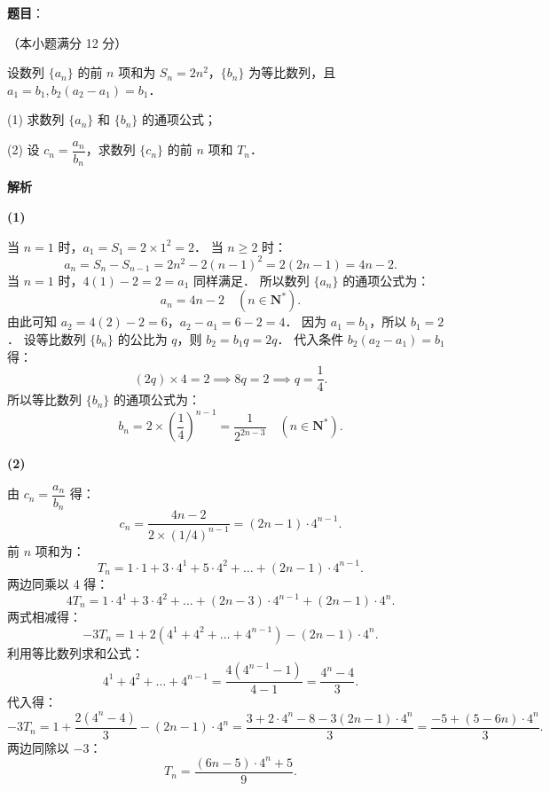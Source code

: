 \begin{answer}

\textbf{题目}：

（本小题满分 12 分）

设数列 $\{a_n\}$ 的前 $n$ 项和为 $S_n = 2n^2$，$\{b_n\}$ 为等比数列，且 $a_1 = b_1, b_2(a_2 - a_1) = b_1$．

(1) 求数列 $\{a_n\}$ 和 $\{b_n\}$ 的通项公式；

(2) 设 $c_n = \dfrac{a_n}{b_n}$，求数列 $\{c_n\}$ 的前 $n$ 项和 $T_n$．

\textbf{解析}

\textbf{(1)}

当 $n = 1$ 时，$a_1 = S_1 = 2 \times 1^2 = 2$．
当 $n \geqslant 2$ 时：
\nopagebreak[4]
\[
a_n = S_n - S_{n-1} = 2n^2 - 2(n - 1)^2 = 2(2n - 1) = 4n - 2.
\]
当 $n = 1$ 时，$4(1) - 2 = 2 = a_1$ 同样满足．
所以数列 $\{a_n\}$ 的通项公式为：
\nopagebreak[4]
\[
a_n = 4n - 2 \quad (n \in \mathbf{N}^*).
\]
由此可知 $a_2 = 4(2) - 2 = 6$，$a_2 - a_1 = 6 - 2 = 4$．
因为 $a_1 = b_1$，所以 $b_1 = 2$．
设等比数列 $\{b_n\}$ 的公比为 $q$，则 $b_2 = b_1 q = 2q$．
代入条件 $b_2(a_2 - a_1) = b_1$ 得：
\nopagebreak[4]
\[
(2q) \times 4 = 2 \implies 8q = 2 \implies q = \frac{1}{4}.
\]
所以等比数列 $\{b_n\}$ 的通项公式为：
\nopagebreak[4]
\[
b_n = 2 \times \left(\frac{1}{4}\right)^{n-1} = \frac{1}{2^{2n-3}} \quad (n \in \mathbf{N}^*).
\]

\textbf{(2)}

由 $c_n = \dfrac{a_n}{b_n}$ 得：
\nopagebreak[4]
\[
c_n = \frac{4n - 2}{2 \times (1/4)^{n-1}} = (2n - 1) \cdot 4^{n-1}.
\]
前 $n$ 项和为：
\nopagebreak[4]
\[
T_n = 1 \cdot 1 + 3 \cdot 4^1 + 5 \cdot 4^2 + \dots + (2n - 1) \cdot 4^{n-1}.
\]
两边同乘以 4 得：
\nopagebreak[4]
\[
4T_n = 1 \cdot 4^1 + 3 \cdot 4^2 + \dots + (2n - 3) \cdot 4^{n-1} + (2n - 1) \cdot 4^n.
\]
两式相减得：
\nopagebreak[4]
\[
-3T_n = 1 + 2(4^1 + 4^2 + \dots + 4^{n-1}) - (2n - 1) \cdot 4^n.
\]
利用等比数列求和公式：
\nopagebreak[4]
\[
4^1 + 4^2 + \dots + 4^{n-1} = \frac{4(4^{n-1} - 1)}{4 - 1} = \frac{4^n - 4}{3}.
\]
代入得：
\nopagebreak[4]
\[
-3T_n = 1 + \frac{2(4^n - 4)}{3} - (2n - 1) \cdot 4^n = \frac{3 + 2 \cdot 4^n - 8 - 3(2n - 1) \cdot 4^n}{3} = \frac{-5 + (5 - 6n) \cdot 4^n}{3}.
\]
两边同除以 $-3$：
\nopagebreak[4]
\[
T_n = \frac{(6n - 5) \cdot 4^n + 5}{9}.
\]



\end{answer}
